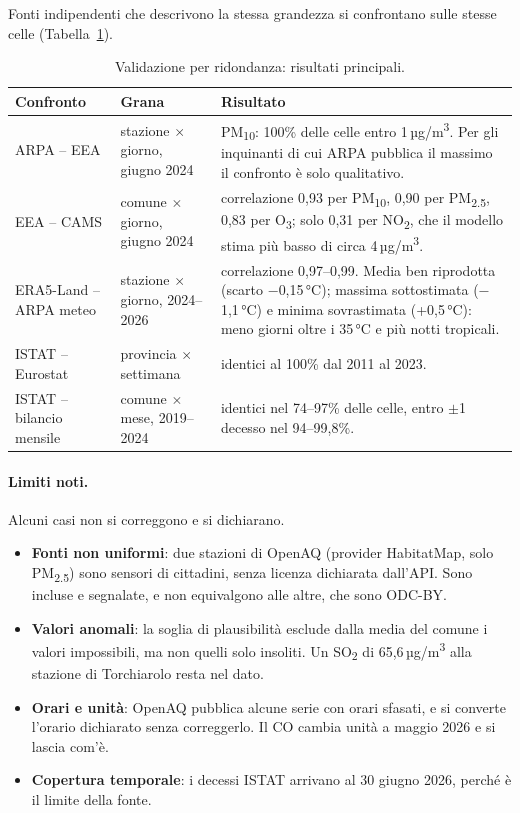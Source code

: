 Fonti indipendenti che descrivono la stessa grandezza si confrontano sulle stesse celle (Tabella~\ref{tab:validazione}).

{\footnotesize
\setlength{\tabcolsep}{3pt}
\begin{longtable}{>{\raggedright\arraybackslash}p{3.0cm}>{\raggedright\arraybackslash}p{2.7cm}>{\raggedright\arraybackslash}p{7.6cm}}
\caption{Validazione per ridondanza: risultati principali.}
\label{tab:validazione}\\
\hline
\textbf{Confronto} & \textbf{Grana} & \textbf{Risultato}\\
\hline
\endfirsthead
\hline
\endfoot
ARPA -- EEA & stazione $\times$ giorno, giugno 2024 & PM\textsubscript{10}: 100\% delle celle entro 1\,µg/m\textsuperscript{3}. Per gli inquinanti di cui ARPA pubblica il massimo il confronto è solo qualitativo.\\
EEA -- CAMS & comune $\times$ giorno, giugno 2024 & correlazione 0,93 per PM\textsubscript{10}, 0,90 per PM\textsubscript{2.5}, 0,83 per O\textsubscript{3}; solo 0,31 per NO\textsubscript{2}, che il modello stima più basso di circa 4\,µg/m\textsuperscript{3}.\\
ERA5-Land -- ARPA meteo & stazione $\times$ giorno, 2024--2026 & correlazione 0,97--0,99. Media ben riprodotta (scarto $-$0,15\,°C); massima sottostimata ($-$1,1\,°C) e minima sovrastimata (+0,5\,°C): meno giorni oltre i 35\,°C e più notti tropicali.\\
ISTAT -- Eurostat & provincia $\times$ settimana & identici al 100\% dal 2011 al 2023.\\
ISTAT -- bilancio mensile & comune $\times$ mese, 2019--2024 & identici nel 74--97\% delle celle, entro $\pm$1 decesso nel 94--99,8\%.\\
\end{longtable}
}
\paragraph{Limiti noti.} Alcuni casi non si correggono e si dichiarano.
\begin{itemize}
  \item \textbf{Fonti non uniformi}: due stazioni di OpenAQ (provider HabitatMap, solo PM\textsubscript{2.5}) sono sensori di cittadini, senza licenza dichiarata dall'API. Sono incluse e segnalate, e non equivalgono alle altre, che sono ODC-BY.
  \item \textbf{Valori anomali}: la soglia di plausibilità esclude dalla media del comune i valori impossibili, ma non quelli solo insoliti. Un SO\textsubscript{2} di 65,6\,µg/m\textsuperscript{3} alla stazione di Torchiarolo resta nel dato.
  \item \textbf{Orari e unità}: OpenAQ pubblica alcune serie con orari sfasati, e si converte l'orario dichiarato senza correggerlo. Il CO cambia unità a maggio 2026 e si lascia com'è.
  \item \textbf{Copertura temporale}: i decessi ISTAT arrivano al 30 giugno 2026, perché è il limite della fonte.
\end{itemize}

